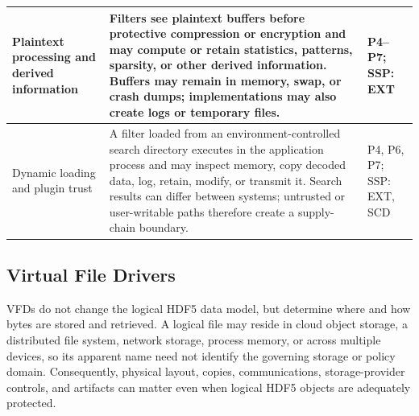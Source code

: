 \documentclass[../main.tex]{subfiles}
\begin{document}
\begin{longtable}{@{}p{}p{}p{}@{}}
Plaintext processing and derived information &
Filters see plaintext buffers before protective compression or encryption and
may compute or retain statistics, patterns, sparsity, or other derived
information. Buffers may remain in memory, swap, or crash dumps; implementations
may also create logs or temporary files. &
P4--P7; SSP: EXT \\
\hline

Dynamic loading and plugin trust &
A filter loaded from an environment-controlled search directory executes in
the application process and may inspect memory, copy decoded data, log,
retain, modify, or transmit it. Search results can differ between systems;
untrusted or user-writable paths therefore create a supply-chain boundary. &
P4, P6, P7; SSP: EXT, SCD \\
\hline
\end{longtable}
\endgroup

\subsection{Virtual File Drivers}

VFDs do not change the logical HDF5 data model, but determine where and how
bytes are stored and retrieved. A logical file may reside in cloud object
storage, a distributed file system, network storage, process memory, or across
multiple devices, so its apparent name need not identify the governing storage
or policy domain. Consequently, physical layout, copies, communications,
storage-provider controls, and artifacts can matter even when logical HDF5
objects are adequately protected.
\end{document}
